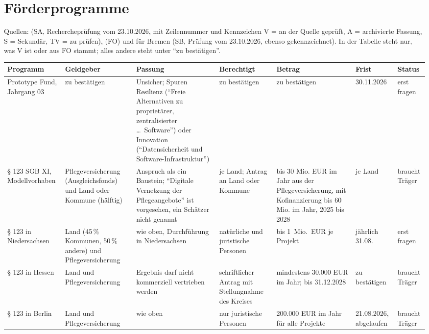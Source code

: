 \documentclass[10pt,parskip=half-]{scrartcl}
\begin{document}
\section{Förderprogramme}

Quellen:  (SA, Rechercheprüfung vom 23.10.2026, mit
Zeilennummer und Kennzeichen V = an der Quelle geprüft, A = archivierte Fassung, S = Sekundär,
TV = zu prüfen),  (FO) und für Bremen 
(SB, Prüfung vom 23.10.2026, ebenso gekennzeichnet). In der Tabelle steht nur, was V ist
oder aus FO stammt; alles andere steht unter \enquote{zu bestätigen}.

{\footnotesize\setlength{\tabcolsep}{3pt}
\begin{longtable}{@{}P{18mm}P{19mm}P{28mm}P{25mm}P{23mm}P{17mm}P{14mm}@{}}
\toprule
\textbf{Programm} & \textbf{Geldgeber} & \textbf{Passung} & \textbf{Berechtigt} &
\textbf{Betrag} & \textbf{Frist} & \textbf{Status}\\
\midrule
\endhead
Prototype Fund, Jahrgang 03 & zu bestätigen & Unsicher; Spuren Resilienz (\enquote{Freie
  Alternativen zu proprietärer, zentralisierter \dots\ Software}) oder Innovation
  (\enquote{Datensicherheit und Software-Infrastruktur}) & zu bestätigen & zu bestätigen &
  30.11.2026 & erst fragen \\
§ 123 SGB XI, Modellvorhaben & Pflegeversicherung (Ausgleichsfonds) und Land oder Kommune
  (hälftig) & Anspruch als ein Baustein; \enquote{Digitale Vernetzung der Pflegeangebote} ist
  vorgesehen, ein Schätzer nicht genannt & je Land; Antrag an Land oder Kommune & bis
  30 Mio. EUR im Jahr aus der Pflegeversicherung, mit Kofinanzierung bis 60 Mio. im Jahr, 2025 bis 2028 & je Land &
  braucht Träger \\
§ 123 in Niedersachsen & Land (45\,\% Kommunen, 50\,\% andere) und Pflegeversicherung &
  wie oben, Durchführung in Niedersachsen & natürliche und juristische Personen & bis 1~Mio.~EUR
  je Projekt & jährlich 31.08. & erst fragen \\
§ 123 in Hessen & Land und Pflegeversicherung & Ergebnis darf nicht kommerziell vertrieben werden
  & schriftlicher Antrag mit Stellungnahme des Kreises & mindestens 30.000 EUR im Jahr; bis
  31.12.2028 & zu bestätigen & braucht Träger \\
§ 123 in Berlin & Land und Pflegeversicherung & wie oben & nur juristische Personen &
  200.000 EUR im Jahr für alle Projekte & 21.08.2026, abgelaufen & braucht Träger \\

\end{longtable}}
\end{document}
